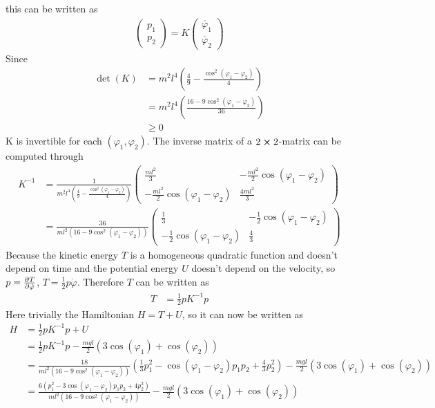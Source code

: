 \documentclass{article}
\begin{document}
this can be written as
\begin{align}
	\begin{pmatrix}p_1\\p_2\end{pmatrix}=K\begin{pmatrix}\dot{\varphi_1}\\\dot{\varphi_2}\end{pmatrix}
\end{align}
Since 
\begin{align}
	\det\left(K\right) &= m^2l^4\left(\frac{4}{9}-\frac{\cos^2\left(\varphi_1-\varphi_2\right)}{4}\right)\\
	&= m^2l^4\left(\frac{16-9\cos^2\left(\varphi_1-\varphi_2\right)}{36}\right)\\
	&\geq 0
\end{align}
K is invertible for each $\left(\varphi_1, \varphi_2\right)$. The inverse matrix of a $2\cross 2$-matrix can be computed through
\begin{align}
	K^{-1}&=\frac{1}{m^2l^4\left(\frac{4}{9}-\frac{\cos^2\left(\varphi_1-\varphi_2\right)}{4}\right)}\begin{pmatrix}\frac{ml^2}{3}&-\frac{ml^2}{2}\cos\left(\varphi_1-\varphi_2\right)\\-\frac{ml^2}{2}\cos\left(\varphi_1-\varphi_2\right)&\frac{4ml^2}{3}\end{pmatrix}\\
	&=\frac{36}{ml^2\left(16-9\cos^2\left(\varphi_1-\varphi_2\right)\right)}\begin{pmatrix}\frac{1}{3}&-\frac{1}{2}\cos\left(\varphi_1-\varphi_2\right)\\-\frac{1}{2}\cos\left(\varphi_1-\varphi_2\right)&\frac{4}{3}\end{pmatrix}
\end{align}
Because the kinetic energy $T$ is a homogeneous quadratic function and doesn't depend on time and the potential energy $U$ doesn't depend on the velocity, so $p=\pdv{T}{\dot{\varphi}}$, $T=\frac{1}{2}p\dot{\varphi}$. 
Therefore $T$ can be written as
\begin{align}
	T&=\frac{1}{2}pK^{-1}p
\end{align}
Here trivially the Hamiltonian $H=T+U$, so it can now be written as
\begin{align}
	H&=\frac{1}{2}pK^{-1}p+U\\
	&=\frac{1}{2}pK^{-1}p-\frac{mgl}{2}\left(3\cos\left(\varphi_1\right)+\cos\left(\varphi_2\right)\right)\\
	&=\frac{18}{ml^2\left(16-9\cos^2\left(\varphi_1-\varphi_2\right)\right)}\left(\frac{1}{3}p_1^2-\cos\left(\varphi_1-\varphi_2\right)p_1p_2+\frac{4}{3}p_2^2\right)-\frac{mgl}{2}\left(3\cos\left(\varphi_1\right)+\cos\left(\varphi_2\right)\right)\\
	&=\frac{6\left(p_1^2-3\cos\left(\varphi_1-\varphi_2\right)p_1p_2+4p_2^2\right)}{ml^2\left(16-9\cos^2\left(\varphi_1-\varphi_2\right)\right)}-\frac{mgl}{2}\left(3\cos\left(\varphi_1\right)+\cos\left(\varphi_2\right)\right)	
\end{align}
\end{document}
